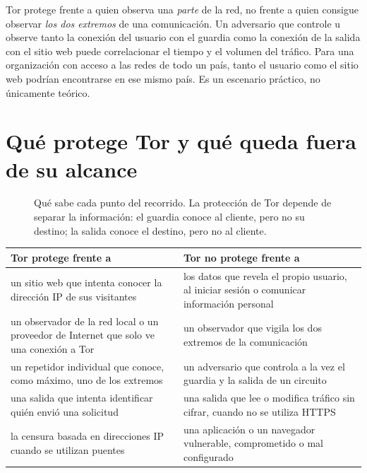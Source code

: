 \begin{attenzione}
Tor protege frente a quien observa una \emph{parte} de la red, no frente a quien consigue observar \emph{los dos extremos} de una comunicación. Un adversario que controle u observe tanto la conexión del usuario con el guardia como la conexión de la salida con el sitio web puede correlacionar el tiempo y el volumen del tráfico. Para una organización con acceso a las redes de todo un país, tanto el usuario como el sitio web podrían encontrarse en ese mismo país. Es un escenario práctico, no únicamente teórico.
\end{attenzione}

\section{Qué protege Tor y qué queda fuera de su alcance}\label{sec:minaccia-sintesi}

\begin{figure}[htbp]
\centering

\caption{Qué sabe cada punto del recorrido. La protección de Tor depende de separar la información: el guardia conoce al cliente, pero no su destino; la salida conoce el destino, pero no al cliente.}
\label{fig:sapere}
\end{figure}

\begin{center}\small
\begin{tabularx}{\textwidth}{@{}>{\raggedright\arraybackslash}X>{\raggedright\arraybackslash}X@{}}
\toprule
Tor protege frente a & Tor no protege frente a \\
\midrule
un sitio web que intenta conocer la dirección IP de sus visitantes & los datos que revela el propio usuario, al iniciar sesión o comunicar información personal \\
un observador de la red local o un proveedor de Internet que solo ve una conexión a Tor & un observador que vigila los dos extremos de la comunicación \\
un repetidor individual que conoce, como máximo, uno de los extremos & un adversario que controla a la vez el guardia y la salida de un circuito \\
una salida que intenta identificar quién envió una solicitud & una salida que lee o modifica tráfico sin cifrar, cuando no se utiliza HTTPS \\
la censura basada en direcciones IP cuando se utilizan puentes & una aplicación o un navegador vulnerable, comprometido o mal configurado \\
\bottomrule
\end{tabularx}
\end{center}

